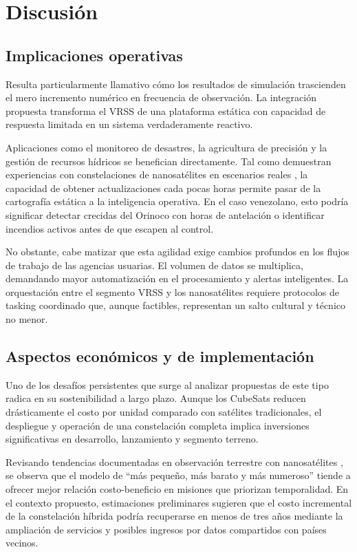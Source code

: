 \section{Discusión}

\subsection{Implicaciones operativas}

Resulta particularmente llamativo cómo los resultados de simulación trascienden el mero incremento numérico en frecuencia de observación. La integración propuesta transforma el VRSS de una plataforma estática con capacidad de respuesta limitada en un sistema verdaderamente reactivo. 

Aplicaciones como el monitoreo de desastres, la agricultura de precisión y la gestión de recursos hídricos se benefician directamente. Tal como demuestran experiencias con constelaciones de nanosatélites en escenarios reales \cite{Kerrouche2023}, la capacidad de obtener actualizaciones cada pocas horas permite pasar de la cartografía estática a la inteligencia operativa. En el caso venezolano, esto podría significar detectar crecidas del Orinoco con horas de antelación o identificar incendios activos antes de que escapen al control.

No obstante, cabe matizar que esta agilidad exige cambios profundos en los flujos de trabajo de las agencias usuarias. El volumen de datos se multiplica, demandando mayor automatización en el procesamiento y alertas inteligentes. La orquestación entre el segmento VRSS y los nanosatélites requiere protocolos de tasking coordinado que, aunque factibles, representan un salto cultural y técnico no menor.

\subsection{Aspectos económicos y de implementación}

Uno de los desafíos persistentes que surge al analizar propuestas de este tipo radica en su sostenibilidad a largo plazo. Aunque los CubeSats reducen drásticamente el costo por unidad comparado con satélites tradicionales, el despliegue y operación de una constelación completa implica inversiones significativas en desarrollo, lanzamiento y segmento terreno.

Revisando tendencias documentadas en observación terrestre con nanosatélites \cite{Nagel2020}, se observa que el modelo de “más pequeño, más barato y más numeroso” tiende a ofrecer mejor relación costo-beneficio en misiones que priorizan temporalidad. En el contexto propuesto, estimaciones preliminares sugieren que el costo incremental de la constelación híbrida podría recuperarse en menos de tres años mediante la ampliación de servicios y posibles ingresos por datos compartidos con países vecinos.

